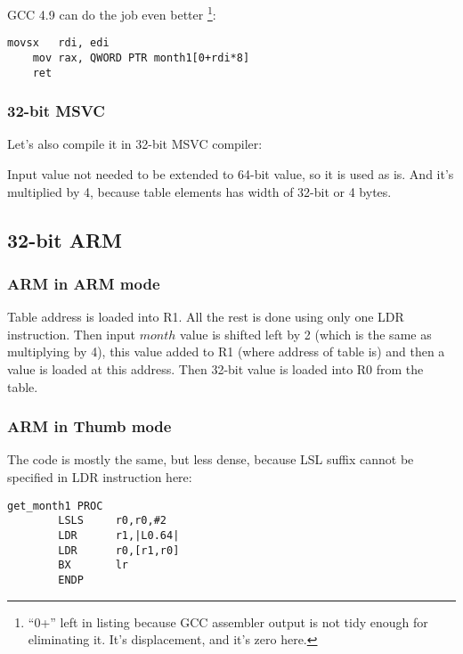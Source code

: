 \Optimizing GCC 4.9 can do the job even better
\footnote{``0+'' left in listing because GCC assembler output is not tidy enough for eliminating it. 
It's displacement, and it's zero here.}:

\begin{lstlisting}[caption=\Optimizing GCC 4.9 x64]
	movsx	rdi, edi
	mov	rax, QWORD PTR month1[0+rdi*8]
	ret
\end{lstlisting}

\subsubsection{32-bit MSVC}

Let's also compile it in 32-bit MSVC compiler:



Input value not needed to be extended to 64-bit value, so it is used as is.
And it's multiplied by 4, because table elements has width of 32-bit or 4 bytes.

\ifdefined\IncludeARM
\subsection{32-bit ARM}

\subsubsection{ARM in ARM mode}



Table address is loaded into R1.
All the rest is done using only one LDR instruction.
Then input $month$ value is shifted left by 2 (which is the same as multiplying by 4), this value added
to R1 (where address of table is) and then a value is loaded at this address.
Then 32-bit value is loaded into R0 from the table.

\subsubsection{ARM in Thumb mode}

The code is mostly the same, but less dense, because LSL suffix cannot be specified in LDR instruction here:

\begin{lstlisting}
get_month1 PROC
        LSLS     r0,r0,#2
        LDR      r1,|L0.64|
        LDR      r0,[r1,r0]
        BX       lr
        ENDP
\end{lstlisting}

